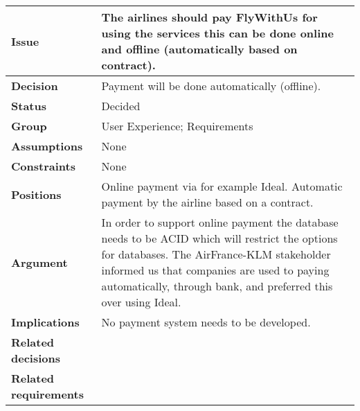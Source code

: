 
\label{dd:payment}
\begin{tabular}{ l  p{10cm}}
\hline
\bf Issue & The airlines should pay FlyWithUs for using the services this can be done online and offline (automatically based on contract). \\
\hline
\bf Decision & Payment will be done automatically (offline). \\
\hline
\bf Status & Decided \\
\hline
\bf Group & User Experience;  Requirements \\
\hline
\bf Assumptions & None \\
\hline
\bf Constraints & None \\
\hline
\bf Positions & Online payment via for example Ideal. \newline\newline
Automatic payment by the airline based on a contract. \\
\hline
\bf Argument & In order to support online payment the database needs to be ACID which will restrict the options for databases. The AirFrance-KLM stakeholder informed us that companies are used to paying automatically, through bank, and preferred this over using Ideal. \\
\hline
\bf Implications & No payment system needs to be developed. \\
\hline
\bf Related decisions & \\
\hline
\bf Related requirements  & \\
\hline
\end{tabular}

